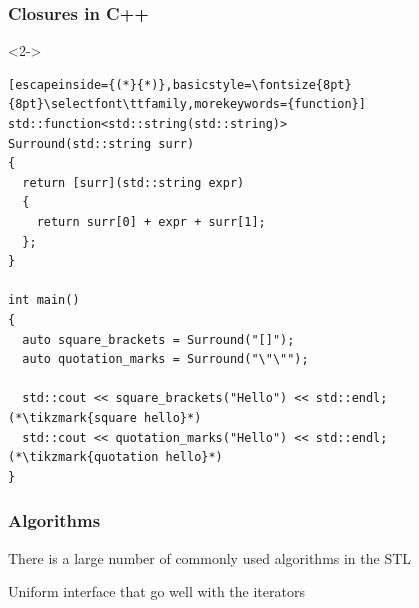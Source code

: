 \documentclass[14pt,a4paper,dvipsnames,usenames]{beamer}
\begin{document}
\begin{frame}[fragile]
  \frametitle{Closures in C++}


  \begin{onlyenv}<2->
  \begin{lstlisting}[escapeinside={(*}{*)},basicstyle=\fontsize{8pt}{8pt}\selectfont\ttfamily,morekeywords={function}]
std::function<std::string(std::string)>
Surround(std::string surr)
{
  return [surr](std::string expr)
  {
    return surr[0] + expr + surr[1];
  };
}

int main()
{
  auto square_brackets = Surround("[]");
  auto quotation_marks = Surround("\"\"");

  std::cout << square_brackets("Hello") << std::endl; (*\tikzmark{square hello}*)
  std::cout << quotation_marks("Hello") << std::endl; (*\tikzmark{quotation hello}*)
}
  \end{lstlisting}


  \CPPEleven

  \end{onlyenv}

\end{frame}

\begin{frame}[fragile]
  \frametitle{Algorithms}

  There is a large number of commonly used algorithms in the STL

  \vspace{1cm}
  Uniform interface that go well with the iterators

  
\end{frame}
\end{document}
